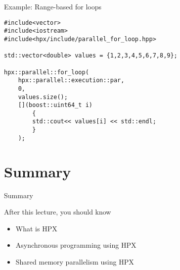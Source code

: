 \documentclass[12pt,t]{beamer}
\begin{document}
\begin{frame}[fragile]{Example: Range-based for loops}


\begin{lstlisting}
#include<vector>
#include<iostream>
#include<hpx/include/parallel_for_loop.hpp>

std::vector<double> values = {1,2,3,4,5,6,7,8,9};

hpx::parallel::for_loop(
	hpx::parallel::execution::par, 
	0, 
	values.size();
	[](boost::uint64_t i)
		{
		std::cout<< values[i] << std::endl;
		}
	);
\end{lstlisting}

\end{frame}




\section{Summary}
\begin{frame}{Summary}
\begin{block}{After this lecture, you should know}
\begin{itemize}
\item What is HPX
\item Asynchronous programming using HPX
\item Shared memory parallelism using HPX
\end{itemize}
\end{block}
\end{frame}
\end{document}
